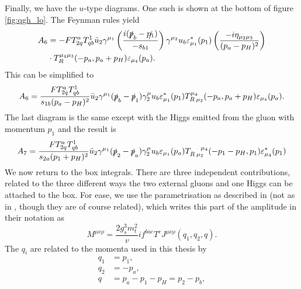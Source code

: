 Finally, we have the $u$-type diagrams. One such is shown at the bottom of figure \ref{fig:qgh_lo}. The Feynman rules yield
\begin{equation}
\begin{split}
A_6 &=-FT^a_{2q}T^1_{qb} \bar{u}_2 \gamma^{\mu_1}\left(\frac{i(\slashed{p}_b - \slashed{p_1})}{-s_{b1}} \right)\gamma^{\mu_2}u_b \varepsilon_{\mu_1}^*(p_1)\left(\frac{-i \eta_{\mu_2 \mu_3}}{(p_a-p_H)^2}\right)\\
& \cdot T_R^{\mu_4 \mu_3}(-p_a,p_a+p_H)\varepsilon_{\mu_4}(p_a).
\end{split}
\end{equation}
This can be simplified to
\begin{equation}
A_6 = \frac{F T^a_{2q}T^1_{qb}}{s_{1b}(p_a-p_H)^2} \bar{u}_2 \gamma^{\mu_1} (\slashed{p}_b - \slashed{p}_1) \gamma^\mu_2 u_b \varepsilon_{\mu_1}^*(p_1)T_{R \hspace{2pt} \mu_2}^{\mu_4}(-p_a,p_a+p_H)\varepsilon_{\mu_4}(p_a).
\end{equation}
The last diagram is the same except with the Higgs emitted from the gluon with momentum $p_1$ and the result is
\begin{equation}
A_7 = \frac{F T^a_{2q}T^1_{qb}}{s_{2a}(p_1+p_H)^2} \bar{u}_2 \gamma^{\mu_1} (\slashed{p}_2 - \slashed{p}_a) \gamma^\mu_2 u_b \varepsilon_{\mu_1}(p_a)T_{R \hspace{2pt} \mu_2}^{\hspace{12pt} \mu_4}(-p_1-p_H,p_1)\varepsilon^*_{\mu_4}(p_1)
\end{equation}
We now return to the box integrals. There are three independent contributions, related to the three different ways the two external gluons and one Higgs can be attached to the box. For ease, we use the parametrisation as described in \cite{Duca2003} (not as in \cite{DelDuca2001}, though they are of course related), which writes this part of the amplitude in their notation as
\begin{equation}
M^{\mu \nu \rho} = \frac{2 g_s^3 m_t^2}{v} i f^{bac}T^c J^{\mu \nu \rho}(q_1,q_2,q).
\end{equation}
The $q_i$ are related to the momenta used in this thesis by
\begin{subequations}
\begin{align}
q_1 &= p_1, \\
q_2 &= - p_a, \\
q &= p_a-p_1-p_H = p_2-p_b,
\end{align}
\end{subequations}
